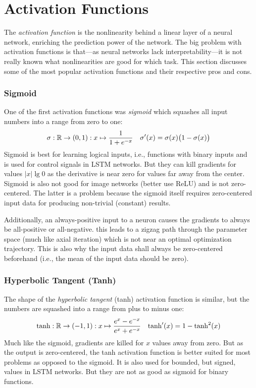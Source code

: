 	\section{Activation Functions}
		\label{sec:activationFunctions}

		The \emph{activation function} is the nonlinearity behind a linear layer of a neural network, enriching the prediction power of the network. The big problem with activation functions is that---as neural networks lack interpretability---it is not really known what nonlinearities are good for which task. This section discusses some of the most popular activation functions and their respective pros and cons.

		\subsubsection{Sigmoid}
			One of the first activation functions was \emph{sigmoid} which squashes all input numbers into a range from zero to one:
			\begin{align}
				\sigma : \mathbb{R} \to (0, 1) : x \mapsto \frac{1}{1 + e^{-x}} &&
				\sigma'(x) = \sigma(x) \bigl( 1 - \sigma(x) \bigr)
			\end{align}
			Sigmoid is best for learning logical inputs, i.e., functions with binary inputs and is used for control signals in LSTM networks. But they can kill gradients for values \( \lvert x \rvert \lg 0 \) as the derivative is near zero for values far away from the center. Sigmoid is also not good for image networks (better use ReLU) and is not zero-centered. The latter is a problem because the sigmoid itself requires zero-centered input data for producing non-trivial (constant) results.

			Additionally, an always-positive input to a neuron causes the gradients to always be all-positive or all-negative. this leads to a zigzag path through the parameter space (much like axial iteration) which is not near an optimal optimization trajectory. This is also why the input data shall always be zero-centered beforehand (i.e., the mean of the input data should be zero).

		\subsubsection{Hyperbolic Tangent (Tanh)}
			The shape of the \emph{hyperbolic tangent} (tanh) activation function is similar, but the numbers are squashed into a range from plus to minus one:
			\begin{align}
				\tanh : \mathbb{R} \to (-1, 1) : x \mapsto \frac{e^x - e^{-x}}{e^x + e^{-x}} &&
				\tanh'(x) = 1 - \tanh^2(x)
			\end{align}
			Much like the sigmoid, gradients are killed for \(x\) values away from zero. But as the output is zero-centered, the tanh activation function is better suited for most problems as opposed to the sigmoid. It is also used for bounded, but signed, values in LSTM networks. But they are not as good as sigmoid for binary functions.

